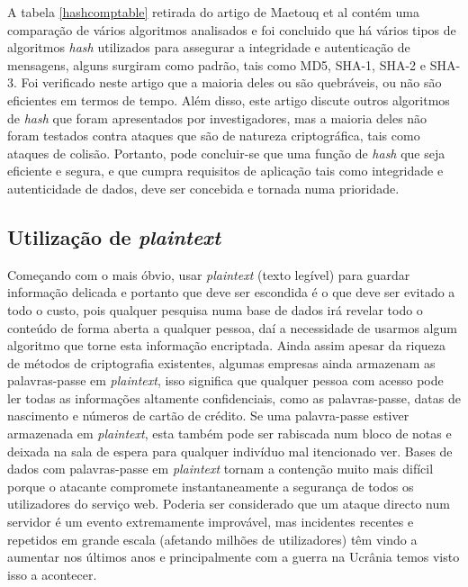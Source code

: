 \documentclass[conference]{IEEEtran}
\begin{document}
A tabela \ref{hashcomptable} retirada do artigo de Maetouq et al \cite{maetouq2018comparison} 
contém uma comparação de vários algoritmos analisados e foi concluido que 
há vários tipos de algoritmos \textit{hash} utilizados para assegurar a integridade e 
autenticação de mensagens, alguns surgiram como padrão, tais como MD5, SHA-1, SHA-2 e SHA-3. 
Foi verificado neste artigo que a maioria deles ou são quebráveis, 
ou não são eficientes em termos de tempo. Além disso, este artigo discute outros 
algoritmos de \textit{hash} que foram apresentados por investigadores, mas a maioria deles 
não foram testados contra ataques que são de natureza criptográfica, tais como 
ataques de colisão. Portanto, pode concluir-se que uma função de \textit{hash} que seja 
eficiente e segura, e que cumpra requisitos de aplicação tais como integridade e 
autenticidade de dados, deve ser concebida e tornada numa prioridade.

\subsection{Utilização de \textit{plaintext}}

Começando com o mais óbvio, usar \textit{plaintext} (texto legível) para guardar informação delicada e 
portanto que deve ser escondida é o que deve ser evitado a todo o custo, pois 
qualquer pesquisa numa base de dados irá revelar todo o conteúdo de forma aberta 
a qualquer pessoa, daí a necessidade de usarmos algum algoritmo que torne esta 
informação encriptada. Ainda assim apesar da riqueza de métodos de criptografia 
existentes, algumas empresas ainda armazenam as palavras-passe em \textit{plaintext}, isso significa 
que qualquer pessoa com acesso pode ler todas as informações altamente confidenciais, 
como as palavras-passe, datas de nascimento e números de cartão de crédito. 
Se uma palavra-passe estiver armazenada em \textit{plaintext}, esta também pode ser rabiscada num bloco de notas e 
deixada na sala de espera para qualquer indivíduo mal itencionado ver. Bases de dados com 
palavras-passe em \textit{plaintext} tornam a contenção muito mais difícil porque o atacante compromete 
instantaneamente a segurança de todos os utilizadores do serviço web. Poderia ser 
considerado que um ataque directo num servidor é um evento extremamente improvável, 
mas incidentes recentes e repetidos em grande escala (afetando milhões de utilizadores) 
têm vindo a aumentar nos últimos anos \cite{ashley2022cyber} e principalmente com a 
guerra na Ucrânia temos visto isso a acontecer.
\end{document}
